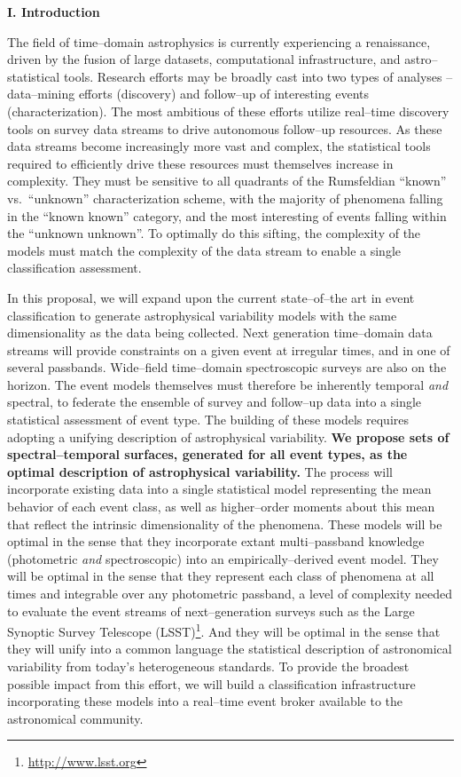 \centerline{\bf I. Introduction} \smallskip

The field of time--domain astrophysics is currently experiencing a renaissance,
driven by the fusion of large datasets, computational infrastructure, and
astro--statistical tools.  Research efforts may be broadly cast into two types
of analyses -- data--mining efforts (discovery) and follow--up of interesting
events (characterization).  The most ambitious of these efforts utilize
real--time discovery tools on survey data streams to drive autonomous follow--up
resources. As these data streams become increasingly more vast and complex, the
statistical tools required to efficiently drive these resources must themselves
increase in complexity.  They must be sensitive to all quadrants of the
Rumsfeldian ``known'' vs.\ ``unknown'' characterization scheme, with the
majority of phenomena falling in the ``known known'' category, and the most
interesting of events falling within the ``unknown unknown''.  To optimally do
this sifting, the complexity of the models must match the complexity of the data
stream to enable a single classification assessment.

In this proposal, we will expand upon the current state--of--the art in event
classification to generate astrophysical variability models with the same
dimensionality as the data being collected. Next generation time--domain data
streams will provide constraints on a given event at irregular times, and in one
of several passbands.  Wide--field time--domain spectroscopic surveys are also
on the horizon.  The event models themselves must therefore be inherently
temporal {\it and} spectral, to federate the ensemble of survey and follow--up
data into a single statistical assessment of event type.  The building of these
models requires adopting a unifying description of astrophysical variability.
{\bf We propose sets of spectral--temporal surfaces, generated for all event
types, as the optimal description of astrophysical variability.}  The process
will incorporate existing data into a single statistical model representing the
mean behavior of each event class, as well as higher--order moments about this
mean that reflect the intrinsic dimensionality of the phenomena.  These models
will be optimal in the sense that they incorporate extant multi--passband
knowledge (photometric {\it and} spectroscopic) into an empirically--derived
event model. They will be optimal in the sense that they represent each class of
phenomena at all times and integrable over any photometric passband, a level of
complexity needed to evaluate the event streams of next--generation surveys such
as the Large Synoptic Survey Telescope
(LSST)\footnote{\url{http://www.lsst.org}}. And they will be optimal in the
sense that they will unify into a common language the statistical description of
astronomical variability from today's heterogeneous standards.  To provide the
broadest possible impact from this effort, we will build a classification
infrastructure incorporating these models into a real--time event broker
available to the astronomical community.


